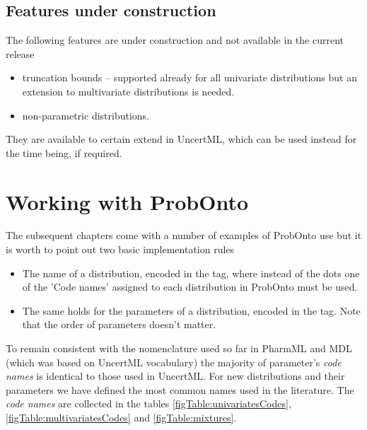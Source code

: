 \subsection{Features under construction}
The following features are under construction and not available in the current 
release
\begin{itemize}
\item
truncation bounds -- supported already for all univariate distributions but an extension 
to multivariate distributions is needed.
\item
non-parametric distributions.
\end{itemize}
They are available to certain extend in UncertML, which can be used instead for the time being, if required.


\section{Working with ProbOnto}
\label{sec:workingProbOnto}
The subsequent chapters come with a number of examples of ProbOnto use
but it is worth to point out two basic implementation rules 
\begin{itemize}
\item 
The name of a distribution, encoded in the  tag, 
where instead of the dots one of the 'Code names' assigned to each distribution in ProbOnto
must be used. 
\item
The same holds for the parameters of a distribution, encoded in the  tag. 
Note that the order of parameters doesn't matter. 
\end{itemize}
To remain consistent with the nomenclature used so far in PharmML and MDL (which
was based on UncertML vocabulary) the majority of parameter's \emph{code names} is 
identical to those used in UncertML. For new distributions and their parameters we have 
defined the most common names used in the literature. 
The  \emph{code names} are collected in the tables \ref{figTable:univariatesCodes}, 
\ref{figTable:multivariatesCodes} and \ref{figTable:mixtures}. 

